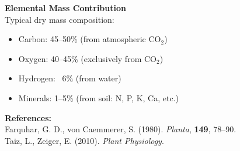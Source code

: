 \begin{technical}
\noindent\textbf{Elemental Mass Contribution}\\[0.5em]
Typical dry mass composition:

\begin{itemize}[leftmargin=*]
  \item Carbon: 45–50\% (from atmospheric \(\mathrm{CO}_2\))
  \item Oxygen: 40–45\% (exclusively from \(\mathrm{CO}_2\))
  \item Hydrogen: ~6\% (from water)
  \item Minerals: 1–5\% (from soil: N, P, K, Ca, etc.)
\end{itemize}

\vspace{0.5em}
\noindent\textbf{References:}\\
Farquhar, G. D., von Caemmerer, S. (1980). \textit{Planta}, \textbf{149}, 78–90.\\
Taiz, L., Zeiger, E. (2010). \textit{Plant Physiology}.
\end{technical}
